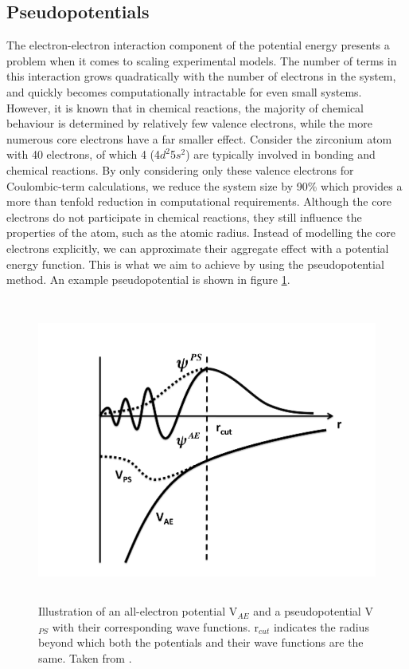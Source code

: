 \subsection{Pseudopotentials}

The electron-electron interaction component of the potential energy presents a problem when it comes to scaling experimental models. The number of terms in this interaction grows quadratically with the number of electrons in the system, and quickly becomes computationally intractable for even small systems. However, it is known that in chemical reactions, the majority of chemical behaviour is determined by relatively few valence electrons, while the more numerous core electrons have a far smaller effect. Consider the zirconium atom with 40 electrons, of which 4 (4$d^2$5$s^2$) are typically involved in bonding and chemical reactions. By only considering only these valence electrons for Coulombic-term calculations, we reduce the system size by 90\% which provides a more than tenfold reduction in computational requirements. Although the core electrons do not participate in chemical reactions, they still influence the properties of the atom, such as the atomic radius. Instead of modelling the core electrons explicitly, we can approximate their aggregate effect with a potential energy function. This is what we aim to achieve by using the pseudopotential method. An example pseudopotential is shown in figure \ref{figure:pseudopotential}.

\begin{figure} %
\begin{center}
\includegraphics[height=10cm]{images/pseudopotential.png}
\end{center}
\caption[Illustration of an all-electron potential V$_{AE}$ and a pseudopotential V$_{PS}$ with their corresponding wave functions. r$_{cut}$ indicates the radius beyond which both the potentials and their wave functions are the same.]{Illustration of an all-electron potential V$_{AE}$ and a pseudopotential V$_{PS}$ with their corresponding wave functions. r$_{cut}$ indicates the radius beyond which both the potentials and their wave functions are the same. Taken from \cite{Payne1992}. }
\label{figure:pseudopotential}
\end{figure}


